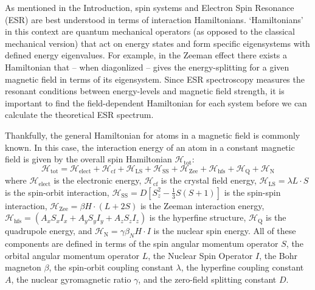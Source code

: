 \documentclass[oneside, astronomy, noacknowlegments]{BYUPhys}
\begin{document}
As mentioned in the Introduction, spin systems and Electron Spin Resonance (ESR) are best understood in terms of interaction Hamiltonians. `Hamiltonians' in this context are quantum mechanical operators (as opposed to the classical mechanical version) that act on energy states and form specific eigensystems with defined energy eigenvalues. For example, in the Zeeman effect there exists a Hamiltonian that -- when diagonlized -- gives the energy-splitting for a given magnetic field in terms of its eigensystem. Since ESR spectroscopy measures the resonant conditions between energy-levels and magnetic field strength, it is important to find the field-dependent Hamiltonian for each system before we can calculate the theoretical ESR spectrum.

Thankfully, the general Hamiltonian for atoms in a magnetic field is commonly known. In this case, the interaction energy of an atom in a constant magnetic field is given by the overall spin Hamiltonian $\mathcal{H}_{\text{tot}}$: $$\mathcal{H}_{\text{tot}} = \mathcal{H}_{\text{elect}} + \mathcal{H}_{\text{cf}} + \mathcal{H}_{\text{LS}} + \mathcal{H}_{\text{SS}} + \mathcal{H}_{\text{Zee}} + \mathcal{H}_{\text{hfs}} + \mathcal{H}_{\text{Q}} + \mathcal{H}_{\text{N}}$$ where $\mathcal{H}_{\text{elect}}$ is the electronic energy, $\mathcal{H}_{\text{cf}}$ is the crystal field energy, $\mathcal{H}_{\text{LS}} = \lambda L \cdot S$ is the spin-orbit interaction, $\mathcal{H}_{\text{SS}} = D \left[ S_{z}^{2} - \frac{1}{3} S (S+1) \right]$ is the spin-spin interaction, $\mathcal{H}_{\text{Zee}} = \beta H \cdot (L+2S)$ is the Zeeman interaction energy, $\mathcal{H}_{\text{hfs}} = \left(A_xS_xI_x + A_yS_yI_y + A_zS_zI_z\right)$ is the hyperfine structure, $\mathcal{H}_{\text{Q}}$ is the quadrupole energy, and $\mathcal{H}_{\text{N}} = \gamma \beta_{N} H \cdot I$ is the nuclear spin energy. All of these components are defined in terms of the spin angular momentum operator $S$, the orbital angular momentum operator $L$, the Nuclear Spin Operator $I$, the Bohr magneton $\beta$, the spin-orbit coupling constant $\lambda$, the hyperfine coupling constant $A$, the nuclear gyromagnetic ratio $\gamma$, and the zero-field splitting constant $D$.
\end{document}

